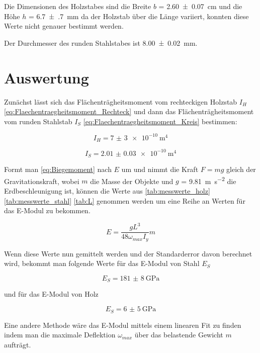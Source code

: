\documentclass[11pt,ngerman]{scrartcl}
\begin{document}
Die Dimensionen des Holzstabes sind die Breite $b$ = \SI{2.60(7)}{\cm} und die Höhe $h$
= \SI{6.7(7)}{\mm} 
da der Holzstab über die Länge variiert, konnten
diese Werte nicht genauer bestimmt werden.

Der Durchmesser des runden Stahlstabes ist \SI{8.00(2)}{\mm}.

\section{Auswertung}
\label{sec:auswertung}

Zunächst lässt sich das Flächenträgheitsmoment vom rechteckigen Holzstab
$I_{H}$ \autoref{eq:Flaechentraegheitsmoment_Rechteck} und dann das
Flächenträgheitsmoment vom runden Stahlstab $I_{S}$
\autoref{eq:Flaechentraegheitsmoment_Kreis} bestimmen:

\begin{equation}
    I_H = \SI{7(3)e-10}{\meter\tothe{4}}
\end{equation}

\begin{equation}
    I_S = \SI{2.01(3)e-10}{\meter\tothe{4}}
\end{equation}

Formt man \autoref{eq:Biegemoment} nach $E$ um und nimmt die Kraft $F=mg$ gleich
der Gravitationskraft, wobei $m$ die Masse der Objekte und $g$ = \SI{9.81}{\meter\per\second\squared}
die Erdbeschleunigung ist, können die Werte aus \autoref{tab:messwerte_holz} \ref{tab:messwerte_stahl}
\ref{tab:L} genommen werden um eine Reihe an Werten für das E-Modul zu bekommen.

\begin{equation}
    E = \frac{g L^3}{48\omega_{max}I_y} m 
\end{equation}

Wenn diese Werte nun gemittelt werden und der Standarderror davon berechnet wird,
bekommt man folgende Werte für das E-Modul von Stahl $E_S$

\begin{equation}
    E_S = \SI{181(8)}{\GPa}
\end{equation}

und für das E-Modul von Holz

\begin{equation}
    E_S = \SI{6(5)}{\GPa}
\end{equation}

Eine andere Methode wäre das E-Modul mittels einem linearen Fit zu finden
indem man die maximale Deflektion $\omega_{max}$ über das belastende Gewicht
$m$ aufträgt.
\end{document}
